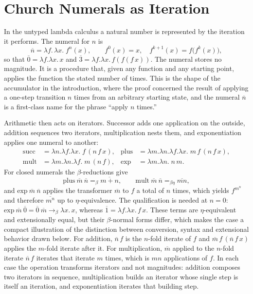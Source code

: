 \documentclass[11pt]{article}
\theoremstyle{definition}
\theoremstyle{remark}
\newcommand{\cn}[1]{\overline{#1}}
\begin{document}
\section{Church Numerals as Iteration}\label{sec:church}

In the untyped lambda calculus \cite{church1936,barendregt1984} a natural number is represented by the iteration it performs. The numeral for $n$ is
\[
\cn{n} = \lambda f.\,\lambda x.\; f^{n}(x), \qquad f^{0}(x) = x, \quad f^{k+1}(x) = f\big(f^{k}(x)\big),
\]
so that $\cn{0} = \lambda f.\lambda x.\,x$ and $\cn{3} = \lambda f.\lambda x.\, f(f(f\,x))$. The numeral stores no magnitude. It is a procedure that, given any function and any starting point, applies the function the stated number of times. This is the shape of the accumulator in the introduction, where the proof concerned the result of applying a one-step transition $n$ times from an arbitrary starting state, and the numeral $\cn{n}$ is a first-class name for the phrase ``apply $n$ times.''

Arithmetic then acts on iterators. Successor adds one application on the outside, addition sequences two iterators, multiplication nests them, and exponentiation applies one numeral to another:
\begin{align*}
\mathrm{succ} &= \lambda n.\lambda f.\lambda x.\; f\,(n\,f\,x), &
\mathrm{plus} &= \lambda m.\lambda n.\lambda f.\lambda x.\; m\,f\,(n\,f\,x), \\
\mathrm{mult} &= \lambda m.\lambda n.\lambda f.\; m\,(n\,f), &
\mathrm{exp} &= \lambda m.\lambda n.\; n\,m .
\end{align*}
For closed numerals the $\beta$-reductions give
\[
\mathrm{plus}\ \cn{m}\ \cn{n} =_{\beta} \cn{m+n},
\qquad
\mathrm{mult}\ \cn{m}\ \cn{n} =_{\beta\eta} \cn{mn},
\]
and $\mathrm{exp}\ \cn{m}\ \cn{n}$ applies the transformer $\cn{m}$ to $f$ a total of $n$ times, which yields $f^{m^{n}}$ and therefore $\cn{m^{n}}$ up to $\eta$-equivalence. The qualification is needed at $n = 0$: $\mathrm{exp}\ \cn{m}\ \cn{0} = \cn{0}\ \cn{m} \to_\beta \lambda x.\,x$, whereas $\cn{1} = \lambda f.\lambda x.\, f\,x$. These terms are $\eta$-equivalent and extensionally equal, but their $\beta$-normal forms differ, which makes the case a compact illustration of the distinction between conversion, syntax and extensional behavior drawn below. For addition, $\cn{n}\,f$ is the $n$-fold iterate of $f$ and $\cn{m}\,f\,(\cn{n}\,f\,x)$ applies the $m$-fold iterate after it. For multiplication, $\cn{m}$ applied to the $n$-fold iterate $\cn{n}\,f$ iterates that iterate $m$ times, which is $mn$ applications of $f$. In each case the operation transforms iterators and not magnitudes: addition composes two iterators in sequence, multiplication builds an iterator whose single step is itself an iteration, and exponentiation iterates that building step.
\end{document}
